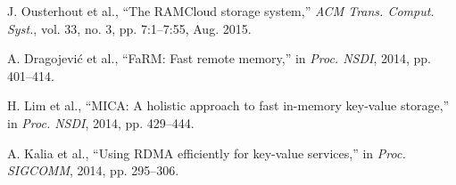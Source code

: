 \documentclass[10pt,conference]{IEEEtran}
\begin{document}
\begin{thebibliography}{99}
J. Ousterhout et al., ``The RAMCloud storage system,'' \textit{ACM Trans. Comput. Syst.}, vol. 33, no. 3, pp. 7:1--7:55, Aug. 2015.

A. Dragojević et al., ``FaRM: Fast remote memory,'' in \textit{Proc. NSDI}, 2014, pp. 401--414.

H. Lim et al., ``MICA: A holistic approach to fast in-memory key-value storage,'' in \textit{Proc. NSDI}, 2014, pp. 429--444.

A. Kalia et al., ``Using RDMA efficiently for key-value services,'' in \textit{Proc. SIGCOMM}, 2014, pp. 295--306.

\end{thebibliography}
\end{document}

